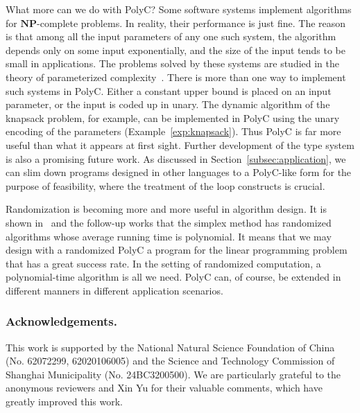 \documentclass[runningheads]{llncs}
\begin{document}
What more can we do with {PolyC}?
Some software systems implement algorithms for $\mathbf{NP}$-complete problems.
In reality, their performance is just fine.
The reason is that among all the input parameters of any one such system, the algorithm depends only on some input exponentially, and the size of the input tends to be small in applications.
The problems solved by these systems are studied in the theory of parameterized complexity~\cite{downey2012parameterized}.
There is more than one way to implement such systems in {PolyC}.
Either a constant upper bound is placed on an input parameter, or the input is coded up in unary.
The dynamic algorithm of the knapsack problem, for example, can be implemented in {PolyC} using the unary encoding of the parameters (Example~\ref{exp:knapsack}).
Thus {PolyC} is far more useful than what it appears at first sight.
Further development of the type system is also a promising future work.
As discussed in Section~\ref{subsec:application}, we can slim down programs designed in other languages to a PolyC-like form for the purpose of feasibility, where the treatment of the loop constructs is crucial.

Randomization is becoming more and more useful in algorithm design.
It is shown in~\cite{10.1145/380752.380813} and the follow-up works that the simplex method has randomized algorithms whose average running time is polynomial.
It means that we may design with a randomized PolyC a program for the linear programming problem that has a great success rate.
In the setting of randomized computation, a polynomial-time algorithm is all we need. 
PolyC can, of course, be extended in different manners in different application scenarios.

\subsubsection{Acknowledgements.}
This work is supported by the National Natural Science Foundation of China (No. 62072299, 62020106005) and the Science and Technology Commission of Shanghai Municipality (No. 24BC3200500).
We are particularly grateful to the anonymous reviewers and Xin Yu for their valuable comments, which have greatly improved this work.





\appendix

\end{document}
